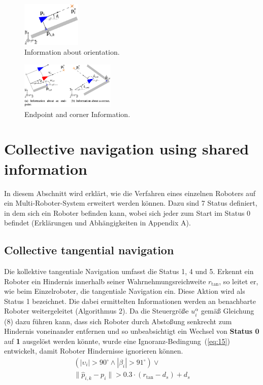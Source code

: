 \documentclass[conference]{IEEEtran}
\begin{document}
\begin{figure}[h]
    \centering
    \includegraphics[width=0.25\textwidth]{Pictures/Information about orientation.png}
    \caption{Information about orientation.}
    \label{fig:Information about orientation}
\end{figure}

\begin{figure}[h]
    \centering
    \includegraphics[width=0.4\textwidth]{Pictures/Endpoint and corner Information.png}
    \caption{Endpoint and corner Information.}
    \label{fig:Endpoint and corner Information}
\end{figure}


\section{Collective navigation using shared information}
In diesem Abschnitt wird erklärt, wie die Verfahren eines einzelnen Roboters auf ein 
Multi-Roboter-System erweitert werden können. Dazu sind 7 Status definiert, in dem 
sich ein Roboter befinden kann, wobei sich jeder zum Start im Status 0 befindet 
(Erklärungen und Abhängigkeiten in Appendix A).

\subsection*{Collective tangential navigation}
Die kollektive tangentiale Navigation umfasst die Status 1, 4 und 5. Erkennt ein 
Roboter ein Hindernis innerhalb seiner Wahrnehmungsreichweite \( r_{\mathrm{tan}} \), so leitet er, 
wie beim Einzelroboter, die tangentiale Navigation ein. Diese Aktion wird als 
Status 1 bezeichnet. Die dabei ermittelten Informationen werden an benachbarte 
Roboter weitergeleitet (Algorithmus 2).
Da die Steuergröße \( u_i^\alpha \) gemäß Gleichung (8) dazu führen kann, dass sich Roboter 
durch Abstoßung senkrecht zum Hindernis voneinander entfernen und so unbeabsichtigt 
ein Wechsel von \textbf{Status 0} auf \textbf{1} ausgelöst werden könnte, wurde eine 
Ignoranz-Bedingung~(\ref{eq:15}) 
entwickelt, damit Roboter Hindernisse ignorieren können.
\begin{equation}
    \begin{split}
    (|\upsilon_i| > 90^\circ \wedge |\beta_i| > 91^\circ) \vee \\
    \| \hat{p}_{i,k} - p_i \| > 0.3 \cdot (r_{\text{tan}} - d_s) + d_s
    \end{split}
    \label{eq:15}
\end{equation}
\end{document}
